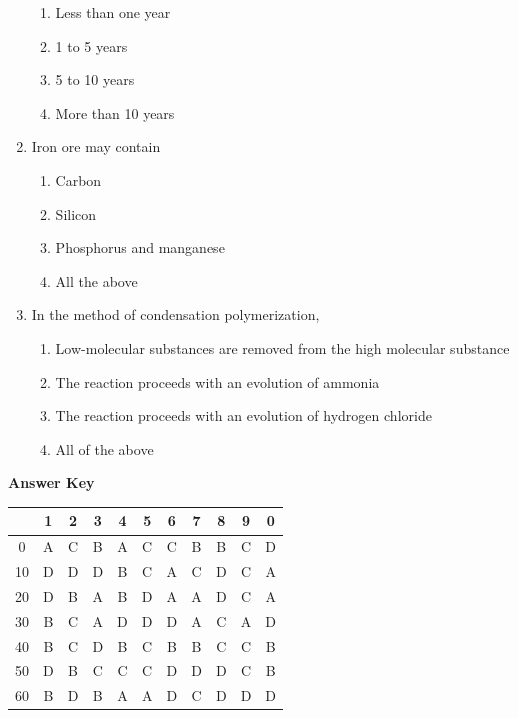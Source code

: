 \documentclass[11pt,a4paper]{article}
\begin{document}
\begin{enumerate}
\begin{enumerate}[label=\Alph*.]
\item{Less than one year}
\item{1 to 5 years}
\item{5 to 10 years}
\item{More than 10 years}
\end{enumerate}
\item{Iron ore may contain}
\begin{enumerate}[label=\Alph*.]
\item{Carbon}
\item{Silicon}
\item{Phosphorus and manganese}
\item{All the above}
\end{enumerate}
\item{In the method of condensation polymerization,}
\begin{enumerate}[label=\Alph*.]
\item{Low-molecular substances are removed from the high molecular substance}
\item{The reaction proceeds with an evolution of ammonia}
\item{The reaction proceeds with an evolution of hydrogen chloride}
\item{All of the above}
\end{enumerate}
\end{enumerate}
\textbf{Answer Key}
\begin{tabular}{ | c | c c c c c c c c c c | }
\hline
 & 1 & 2 & 3 & 4 & 5 & 6 & 7 & 8 & 9 & 0 \\
\hline
0 & A & C & B & A & C & C & B & B & C & D \\
10 & D & D & D & B & C & A & C & D & C & A \\
20 & D & B & A & B & D & A & A & D & C & A \\
30 & B & C & A & D & D & D & A & C & A & D \\
40 & B & C & D & B & C & B & B & C & C & B \\
50 & D & B & C & C & C & D & D & D & C & B \\
60 & B & D & B & A & A & D & C & D & D & D \\
\hline
\end{tabular}
\clearpage
\end{document}
